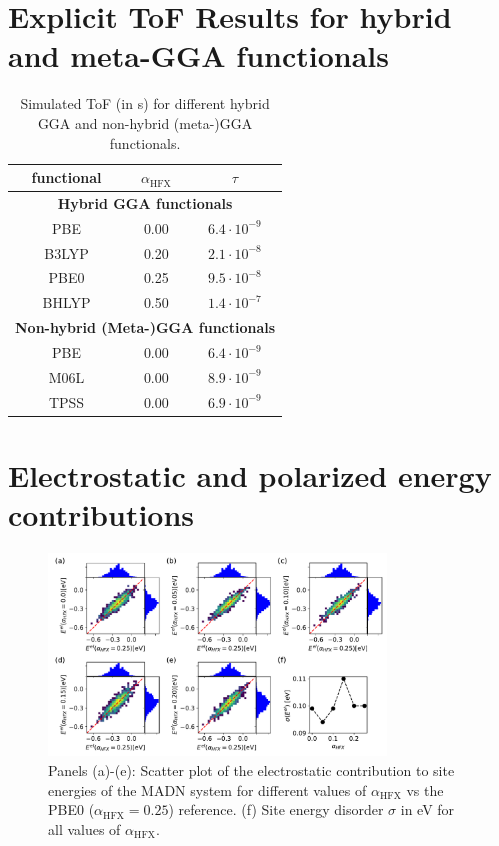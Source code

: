 \documentclass[%
 reprint,
superscriptaddress,
 amsmath,amssymb,
 aps,
prb,
floatfix
]{revtex4-2}
\newcommand{\ahfx}{\ensuremath{\alpha_\text{HFX}}\xspace}
\begin{document}
\section{Explicit ToF Results for hybrid and meta-GGA functionals}
\begin{table}[h]
\caption{Simulated ToF (in \unit[]{s}) for different hybrid GGA and non-hybrid (meta-)GGA functionals.}
\begin{ruledtabular}
  \begin{tabular}{c c c}
        functional & \ahfx & $\tau$ \\
    \hline
    \multicolumn{3}{c}{\bf Hybrid GGA functionals}\\
        PBE & 0.00 &  $6.4 \cdot 10^{-9}$ \\
        B3LYP & 0.20 & $ 2.1 \cdot 10^{-8}$  \\
        PBE0  & 0.25 & $ 9.5 \cdot 10^{-8}$  \\
        BHLYP & 0.50 & $ 1.4 \cdot 10^{-7}$ \\
    \multicolumn{3}{c}{\bf Non-hybrid (Meta-)GGA functionals}\\
        PBE  & 0.00 &  $6.4 \cdot 10^{-9}$ \\
        M06L & 0.00 & $ 8.9 \cdot 10^{-9}$  \\
        TPSS & 0.00 & $ 6.9 \cdot 10^{-9}$ \\
    \end{tabular}
\end{ruledtabular}
  \label{tab:actual_functionals}
\end{table}

\section{Electrostatic and polarized energy contributions}
\begin{figure}
  \centering
  \includegraphics[width=0.80\textwidth]{fig9.pdf}
  \caption{Panels (a)-(e): Scatter plot of the electrostatic contribution to site energies of the MADN system for different values of \ahfx vs the PBE0 ($\ahfx=0.25$) reference. (f) Site energy disorder $\sigma$ in \unit[]{eV} for all values of \ahfx.}
  \label{fig:Estat_qmmm_MADN}
\end{figure}
\end{document}
